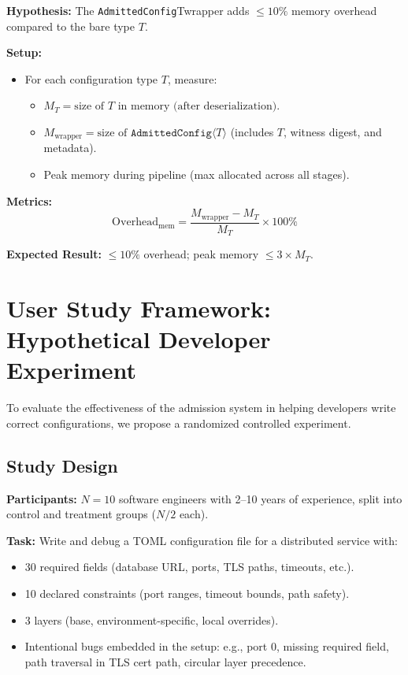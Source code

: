 \documentclass[12pt, letterpaper]{report}
\theoremstyle{plain}
\theoremstyle{definition}
\theoremstyle{remark}
\begin{document}
\textbf{Hypothesis:} The \texttt{AdmittedConfig}\langle T\rangle wrapper adds
$\leq 10\%$ memory overhead compared to the bare type $T$.

\textbf{Setup:}
\begin{itemize}
  \item For each configuration type $T$, measure:
    \begin{itemize}
      \item $M_T = \text{size of } T \text{ in memory (after deserialization)}$.
      \item $M_{\mathrm{wrapper}} = \text{size of } \texttt{AdmittedConfig}\langle T\rangle$
            (includes $T$, witness digest, and metadata).
      \item Peak memory during pipeline (max allocated across all stages).
    \end{itemize}
\end{itemize}

\textbf{Metrics:}
\[
  \mathrm{Overhead}_{\mathrm{mem}} = \frac{M_{\mathrm{wrapper}} - M_T}{M_T} \times 100\%
\]

\textbf{Expected Result:} $\leq 10\%$ overhead; peak memory $\leq 3 \times M_T$.

\section{User Study Framework: Hypothetical Developer Experiment}

To evaluate the effectiveness of the admission system in helping developers
write correct configurations, we propose a randomized controlled experiment.

\subsection{Study Design}

\textbf{Participants:} $N = 10$ software engineers with 2--10 years of experience,
split into control and treatment groups ($N/2$ each).

\textbf{Task:} Write and debug a TOML configuration file for a distributed
service with:
\begin{itemize}
  \item 30 required fields (database URL, ports, TLS paths, timeouts, etc.).
  \item 10 declared constraints (port ranges, timeout bounds, path safety).
  \item 3 layers (base, environment-specific, local overrides).
  \item Intentional bugs embedded in the setup: e.g., port 0, missing required field,
        path traversal in TLS cert path, circular layer precedence.
\end{itemize}
\end{document}
